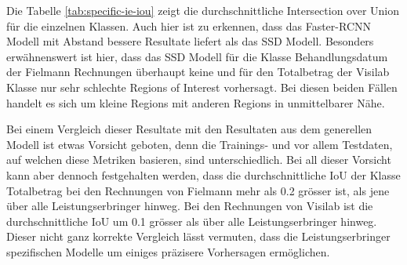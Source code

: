 Die Tabelle \ref{tab:specific-ie-iou} zeigt die durchschnittliche Intersection over Union für die einzelnen Klassen. Auch hier ist zu erkennen, dass das Faster-RCNN Modell mit Abstand bessere Resultate liefert als das SSD Modell. Besonders erwähnenswert ist hier, dass das SSD Modell für die Klasse Behandlungsdatum der Fielmann Rechnungen überhaupt keine und für den Totalbetrag der Visilab Klasse nur sehr schlechte Regions of Interest vorhersagt. Bei diesen beiden Fällen handelt es sich um kleine Regions mit anderen Regions in unmittelbarer Nähe.

Bei einem Vergleich dieser Resultate mit den Resultaten aus dem generellen Modell ist etwas Vorsicht geboten, denn die Trainings- und vor allem Testdaten, auf welchen diese Metriken basieren, sind unterschiedlich. Bei all dieser Vorsicht kann aber dennoch festgehalten werden, dass die durchschnittliche IoU der Klasse Totalbetrag bei den Rechnungen von Fielmann mehr als 0.2 grösser ist, als jene über alle Leistungserbringer hinweg. Bei den Rechnungen von Visilab ist die durchschnittliche IoU um 0.1 grösser als über alle Leistungserbringer hinweg. Dieser nicht ganz korrekte Vergleich lässt vermuten, dass die Leistungserbringer spezifischen Modelle um einiges präzisere Vorhersagen ermöglichen.


